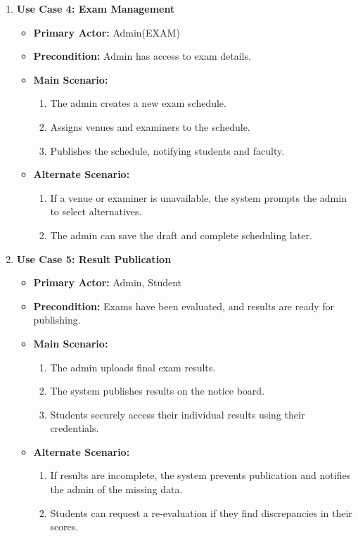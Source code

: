 \documentclass{scrreprt}
\begin{document}
\begin{enumerate}
    \item \textbf{Use Case 4: Exam Management}
    \begin{itemize}
        \item \textbf{Primary Actor:} Admin(EXAM)
        \item \textbf{Precondition:} Admin has access to exam details.
        \item \textbf{Main Scenario:}
        \begin{enumerate}
            \item The admin creates a new exam schedule.
            \item Assigns venues and examiners to the schedule.
            \item Publishes the schedule, notifying students and faculty.
        \end{enumerate}
        \item \textbf{Alternate Scenario:}
        \begin{enumerate}
            \item If a venue or examiner is unavailable, the system prompts the admin to select alternatives.
            \item The admin can save the draft and complete scheduling later.
        \end{enumerate}
    \end{itemize}

    \item \textbf{Use Case 5: Result Publication}
    \begin{itemize}
        \item \textbf{Primary Actor:} Admin, Student
        \item \textbf{Precondition:} Exams have been evaluated, and results are ready for publishing.
        \item \textbf{Main Scenario:}
        \begin{enumerate}
            \item The admin uploads final exam results.
            \item The system publishes results on the notice board.
            \item Students securely access their individual results using their credentials.
        \end{enumerate}
        \item \textbf{Alternate Scenario:}
        \begin{enumerate}
            \item If results are incomplete, the system prevents publication and notifies the admin of the missing data.
            \item Students can request a re-evaluation if they find discrepancies in their scores.
        \end{enumerate}
    \end{itemize}


\end{enumerate}
\end{document}
